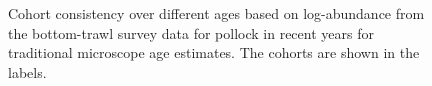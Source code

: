 \documentclass[
  letterpaper,
  DIV=11,
  numbers=noendperiod]{scrreprt}
\begin{document}
\begin{figure}


\caption{\label{fig-consisTMA}Cohort consistency over different ages
based on log-abundance from the bottom-trawl survey data for pollock in
recent years for traditional microscope age estimates. The cohorts are
shown in the labels.}

\end{figure}%
\end{document}
